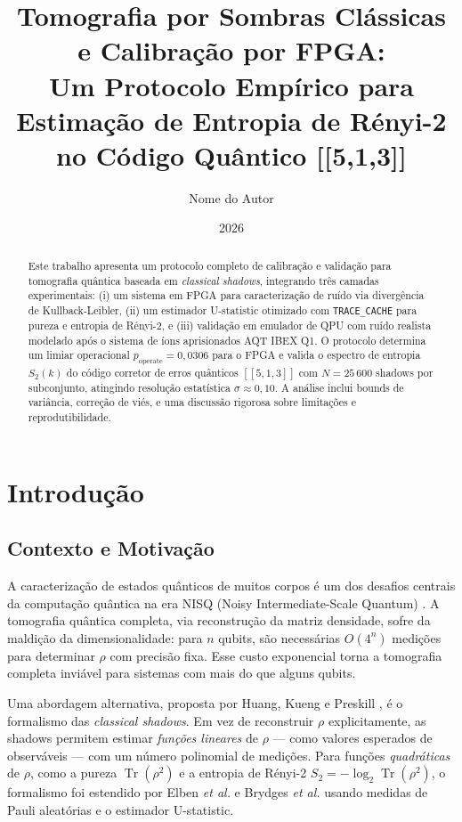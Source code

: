 \documentclass[12pt,a4paper,oneside]{book}
\title{\textbf{Tomografia por Sombras Clássicas e Calibração por FPGA:}\\
\textbf{Um Protocolo Empírico para Estimação de Entropia de Rényi-2}\\
\textbf{no Código Quântico [[5,1,3]]}}
\author{Nome do Autor}
\date{2026}
\theoremstyle{definition}
\theoremstyle{remark}
\DeclareMathOperator{\Tr}{Tr}
\begin{document}
\frontmatter
\maketitle

\begin{abstract}
Este trabalho apresenta um protocolo completo de calibração e validação para tomografia quântica baseada em \textit{classical shadows}, integrando três camadas experimentais: (i) um sistema em FPGA para caracterização de ruído via divergência de Kullback-Leibler, (ii) um estimador U-statistic otimizado com \texttt{TRACE\_CACHE} para pureza e entropia de Rényi-2, e (iii) validação em emulador de QPU com ruído realista modelado após o sistema de íons aprisionados AQT IBEX Q1. O protocolo determina um limiar operacional $p_{\text{operate}} = 0{,}0306$ para o FPGA e valida o espectro de entropia $S_2(k)$ do código corretor de erros quânticos $[[5,1,3]]$ com $N = 25\,600$ shadows por subconjunto, atingindo resolução estatística $\sigma \approx 0{,}10$. A análise inclui bounds de variância, correção de viés, e uma discussão rigorosa sobre limitações e reprodutibilidade.
\end{abstract}

\tableofcontents

\mainmatter

\chapter{Introdução}

\section{Contexto e Motivação}

A caracterização de estados quânticos de muitos corpos é um dos desafios centrais da computação quântica na era NISQ (Noisy Intermediate-Scale Quantum) \cite{preskill2018quantum}. A tomografia quântica completa, via reconstrução da matriz densidade, sofre da maldição da dimensionalidade: para $n$ qubits, são necessárias $O(4^n)$ medições para determinar $\rho$ com precisão fixa. Esse custo exponencial torna a tomografia completa inviável para sistemas com mais do que alguns qubits.

Uma abordagem alternativa, proposta por Huang, Kueng e Preskill \cite{huang2020predicting}, é o formalismo das \textit{classical shadows}. Em vez de reconstruir $\rho$ explicitamente, as shadows permitem estimar \textit{funções lineares} de $\rho$ — como valores esperados de observáveis — com um número polinomial de medições. Para funções \textit{quadráticas} de $\rho$, como a pureza $\Tr(\rho^2)$ e a entropia de Rényi-2 $S_2 = -\log_2 \Tr(\rho^2)$, o formalismo foi estendido por Elben \textit{et al.} \cite{elben2020cross} e Brydges \textit{et al.} \cite{brydges2019probing} usando medidas de Pauli aleatórias e o estimador U-statistic.
\end{document}
